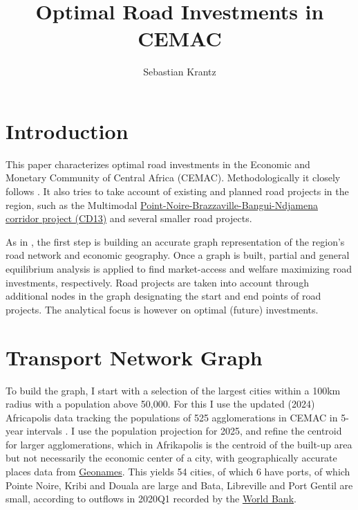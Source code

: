 \documentclass[a4paper]{article}
\title{\textbf{Optimal Road Investments in CEMAC}}
\author{Sebastian Krantz}
\begin{document}
\maketitle

\section{Introduction}

This paper characterizes optimal road investments in the Economic and Monetary Community of Central Africa (CEMAC). Methodologically it closely follows \citet{krantz2024optimal}. It also tries to take account of existing and planned road projects in the region, such as the Multimodal \href{https://www.afdb.org/en/documents/ppm-rca-projet-de-developpement-du-corridor-de-transport-multimodal-pointe-noire-brazzaville-bangui-ndjamena-cd13-phase-1}{Point-Noire-Brazzaville-Bangui-Ndjamena corridor project (CD13)} and several smaller road projects. \newline 

As in \citet{krantz2024optimal}, the first step is building an accurate graph representation of the region's road network and economic geography. Once a graph is built, partial and general equilibrium analysis is applied to find market-access and welfare maximizing road investments, respectively. Road projects are taken into account through additional nodes in the graph designating the start and end points of road projects. The analytical focus is however on optimal (future) investments. 

\section{Transport Network Graph}


To build the graph, I start with a selection of the largest cities within a 100km radius with a population above 50,000. For this I use the updated (2024) Africapolis data tracking the populations of 525 agglomerations in CEMAC in 5-year intervals \citep{africapolis2024}. I use the population projection for 2025, and refine the centroid for larger agglomerations, which in Afrikapolis is the centroid of the built-up area but not necessarily the economic center of a city, with geographically accurate places data from \href{https://public.opendatasoft.com/explore/dataset/geonames-all-cities-with-a-population-500/table/?disjunctive.country}{Geonames}. This yields 54 cities, of which 6 have ports, of which Pointe Noire, Kribi and Douala are large and Bata, Libreville and Port Gentil are small, according to outflows in 2020Q1 recorded by the \href{https://datacatalog.worldbank.org/search/dataset/0038118/Global---International-Ports}{World Bank}. \newline 
\end{document}
